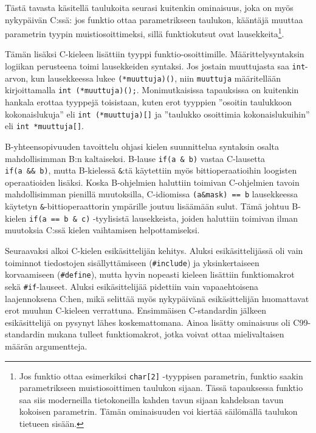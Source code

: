 Tästä tavasta käsitellä taulukoita seurasi kuitenkin ominaisuus, joka on myös
nykypäivän C:ssä: jos funktio ottaa parametrikseen taulukon, kääntäjä muuttaa
parametrin tyypin muistiosoittimeksi, sillä funktiokutsut ovat
lausekkeita\footnote{Jos funktio ottaa esimerkiksi \texttt{char[2]} -tyyppisen
parametrin, funktio saakin parametrikseen muistiosoittimen taulukon sijaan.
Tässä tapauksessa funktio saa siis moderneilla tietokoneilla kahden tavun
sijaan kahdeksan tavun kokoisen parametrin. Tämän ominaisuuden voi kiertää
säilömällä taulukon tietueen sisään.}.

Tämän lisäksi C-kieleen lisättiin tyyppi funktio-osoittimille.
Määrittelysyntaksin logiikan perusteena toimi lausekkeiden syntaksi. Jos
jostain muuttujasta saa \texttt{int}-arvon, kun lausekkeessa lukee
\texttt{(*muuttuja)()}, niin \texttt{muuttuja} määritellään kirjoittamalla
\texttt{int~(*muuttuja)();}. Monimutkaisissa tapauksissa on kuitenkin hankala
erottaa tyyppejä toisistaan, kuten erot tyyppien ''osoitin taulukkoon
kokonaislukuja'' eli \texttt{int~(*muuttuja)[]} ja ''taulukko osoittimia
kokonaislukuihin'' eli \texttt{int~*muuttuja[]}.

B-yhteensopivuuden tavoittelu ohjasi kielen suunnittelua syntaksin osalta
mahdollisimman B:n kaltaiseksi. B-lause \texttt{if(a~\&~b)} vastaa C-lausetta
\texttt{if(a~\&\&~b)}, mutta B-kielessä \texttt{\&}:tä käytettiin myös
bittioperaatioihin loogisten operaatioiden lisäksi. Koska B-ohjelmien haluttiin
toimivan C-ohjelmien tavoin mahdollisimman pienillä muutoksilla, C-idiomissa
\texttt{(a\&mask)~==~b} lausekkeessa käytetyn \texttt{\&}-bittioperaattorin
ympärille joutuu lisäämään sulut. Tämä johtuu B-kielen \texttt{if(a == b \& c)}
-tyylisistä lausekkeista, joiden haluttiin toimivan ilman muutoksia C:ssä
kielen vaihtamisen helpottamiseksi.

Seuraavaksi alkoi C-kielen esikäsittelijän kehitys. Aluksi esikäsittelijässä
oli vain toiminnot tiedostojen sisällyttämiseen (\texttt{\#include}) ja
yksinkertaiseen korvaamiseen (\texttt{\#define}), mutta hyvin nopeasti
kieleen lisättiin funktiomakrot sekä \texttt{\#if}-lauseet. Aluksi
esikäsittelijää pidettiin vain vapaaehtoisena laajennoksena C:hen, mikä
selittää myös nykypäivänä esikäsittelijän huomattavat erot muuhun C-kieleen
verrattuna. Ensimmäisen C-standardin jälkeen esikäsittelijä on pysynyt lähes
koskemattomana. Ainoa lisätty ominaisuus oli C99-standardin mukana tulleet
funktiomakrot, jotka voivat ottaa mielivaltaisen määrän argumentteja.

\grayrule

